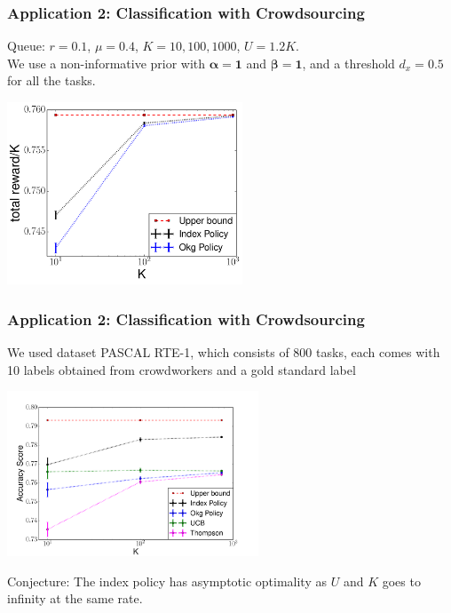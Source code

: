 \documentclass{beamer}
\newcommand{\betav}{\pmb{\beta}}
\newcommand{\alphav}{\pmb{\alpha}}
\begin{document}
\begin{frame}
\frametitle{Application 2: Classification with Crowdsourcing}
Queue: $r=0.1$, $\mu=0.4$, $K = 10,100,1000$, $U = 1.2K$. \\
We use a non-informative prior with $\alphav = \mathbf{1}$ and $\betav = \mathbf{1}$, and a threshold $d_x = 0.5$ for all the tasks. 
\begin{center}
\includegraphics[width=70mm]{plot_up_sim.pdf}
\end{center}
\end{frame}

\begin{frame}
\frametitle{Application 2: Classification with Crowdsourcing}
We used dataset PASCAL RTE-1\cite{Snow2008}, which consists of 800 tasks, each comes with 10 labels obtained from crowdworkers and a gold standard label\\

\begin{center}
\includegraphics[width=75mm]{plot_real_sim_reward.pdf}
\end{center}

Conjecture: The index policy has asymptotic optimality as $U$ and $K$ goes to infinity at the same rate.
\end{frame}
\end{document}
